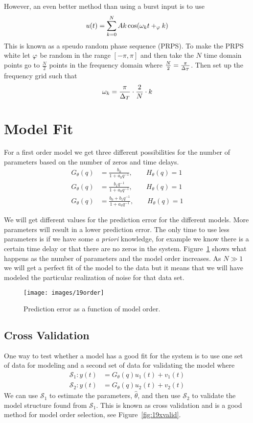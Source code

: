 However, an even better method than using a burst input is to use
$$u(t) = \sum_{k=0}^N Ak\cos(\omega_k t+_\varphi k)$$
This is known as a speudo random phase sequence (PRPS).
To make the PRPS white let $\varphi$ be random in the range $[-\pi,\pi]$ and then take the $N$ time domain points go to $\frac{N}{2}$ points in the frequency domain where $\frac{N}{2}=\frac{\pi}{\Delta_T}$.
Then set up the frequency grid such that
$$\omega_k = \frac{\pi}{\Delta_T}\cdot\frac{2}{N}\cdot k$$

\section{Model Fit}
For a first order model we get three different possibilities for the number of parameters based on the number of zeros and time delays.
\begin{align*}
G_\theta(q) &= \frac{b_0}{1+a_0q^{-1}}, \qquad H_\theta(q) = 1 \\
G_\theta(q) &= \frac{b_1q^{-1}}{1+a_0q^{-1}}, \qquad H_\theta(q) = 1 \\
G_\theta(q) &= \frac{b_0+b_1q^{-1}}{1+a_0q^{-1}}, \qquad H_\theta(q) = 1
\end{align*}

We will get different values for the prediction error for the different models.
More parameters will result in a lower prediction error.
The only time to use less parameters is if we have some \textit{a priori} knowledge, for example we know there is a certain time delay or that there are no zeros in the system.
Figure~\ref{fig:19order} shows what happens as the number of parameters and the model order increases.
As $N\gg1$ we will get a perfect fit of the model to the data but it means that we will have modeled the particular realization of noise for that data set.

\begin{figure}[ht!]
\centering
\texttt{[image: images/19order]}
\caption{Prediction error as a function of model order.}
\label{fig:19order}
\end{figure}

\subsection{Cross Validation}
One way to test whether a model has a good fit for the system is to use one set of data for modeling and a second set of data for validating the model where
\begin{align*}
\mathcal{S}_1: y(t) &= G_\theta(q)u_1(t) + v_1(t) \\
\mathcal{S}_2: y(t) &= G_\theta(q)u_2(t) + v_2(t)
\end{align*}
We can use $\mathcal{S}_1$ to estimate the parameters, $\hat{\theta}$, and then use $\mathcal{S}_2$ to validate the model structure found from $\mathcal{S}_1$.
This is known as cross validation and is a good method for model order selection, see Figure~\ref{fig:19xvalid}.


